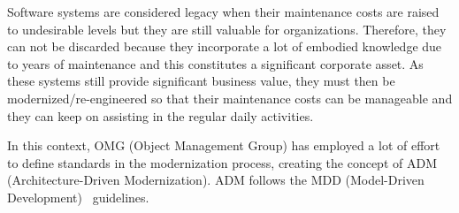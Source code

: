 Software systems are considered legacy when their maintenance costs are raised to undesirable levels but they are still valuable for organizations. Therefore, they can not be discarded because they incorporate a lot of embodied knowledge due to years of maintenance and this constitutes a significant corporate asset. As these systems still provide significant business value, they must then be modernized/re-engineered so that their maintenance costs can be manageable and they can keep on assisting in the regular daily activities. 


In this context, OMG (Object Management Group) has employed a lot of effort to define standards in the modernization process, creating the concept of ADM (Architecture-Driven Modernization). ADM follows the MDD (Model-Driven Development)~\cite{5440163} guidelines.%


